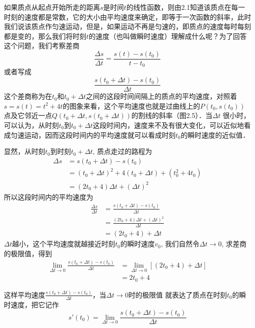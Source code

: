 \begin{analyze}
    如果质点从起点开始所走的距离$s$是时间$t$的线性函数，则由2.1知道该质点在每一时刻的速度都是常数，它的大小由平均速度来确定，即等于一次函数的斜率，此时我们说该质点作匀速运动，但是，如果运动不再是匀速的，即质点的速度每时每刻都是变的，那么我们将时刻$t$的速度（也叫做瞬时速度）理解成什么呢？为了回答这个问题，我们考察差商
\[\frac{\Delta s}{\Delta t}=\frac{s(t)-s(t_0)}{t-t_0}\]
或者写成\[\frac{s(t_0+\Delta t)-s(t_0)}{\Delta t}\]
这个差商称为在$t_0$和$t_0+\Delta t$之间的这段时间间隔上的质点的平均速度，对照着$s=s(t)=t^2+4t$的图象来看，这个平均速度也就是过曲线上的$P(t_0,s(t_0))$
点及它邻近一点$Q(t_0+\Delta t,s(t_0+\Delta t))$的割线的斜率（图2.5）．当$\Delta t$ 很小时，可以认为，从时刻$t_0$到$t_0+\Delta t$这段时间内，速度来不及有很大变化，可以近似地看成匀速运动，因而这段时间内的平均速度就可以看成时刻$t_0$的瞬时速度的近似值．

\begin{figure}[htp]
    \centering

    \caption{}
\end{figure}



显然，从时刻$t_0$到时刻$t_0+\Delta t$, 质点走过的路程为
\begin{align*}
    \Delta s&=s(t_0+\Delta t)-s(t_0)\\
    &=(t_0+\Delta t)^2+4(t_0+\Delta t)+(t^2_0+4t_0)\\
    &=(2t_0+4)\Delta t+(\Delta t)^2
\end{align*}
所以这段时间内的平均速度为
\begin{align*}
    \frac{\Delta s}{\Delta t}&=\frac{s(t_0+\Delta t)-s(t_0)}{\Delta t}\\
    &=\frac{(2t_0+4)\Delta t+(\Delta t)^2}{\Delta t}\\
    &=(2t_0+4)+\Delta t
\end{align*}
$\Delta t$越小，这个平均速度就越接近时刻$t_0$的瞬时速度$v_0$, 我们自然令$\Delta t\to 0$, 求差商的极限值，得到
\begin{align*}
    \lim_{\Delta t\to 0}\frac{s(t_0+\Delta t)-s(t_0)}{\Delta t}&= \lim_{\Delta t\to 0}[(2t_0+4)+\Delta t]\\
    &=2t_0+4
\end{align*}

这样平均速度$\frac{s(t_0+\Delta t)-s(t_0)}{\Delta t}$，当$\Delta t\to 0$时的极限值
就表达了质点在时刻$t_0$的瞬时速度，把它记作
\[s'(t_0)=   \lim_{\Delta t\to 0}\frac{s(t_0+\Delta t)-s(t_0)}{\Delta t}\]
\end{analyze}

